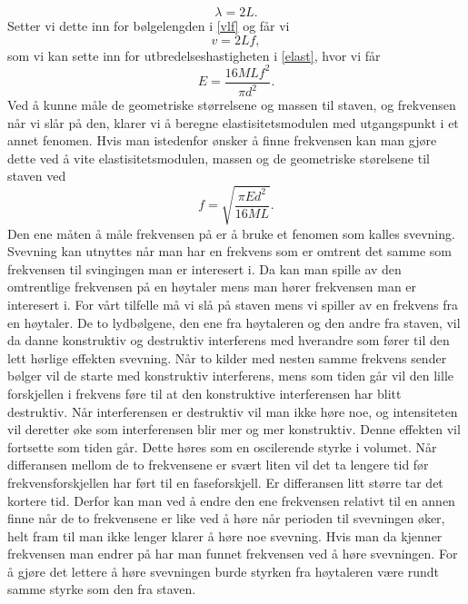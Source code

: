 \documentclass[%
 reprint,
 amsmath,amssymb,
 aps,
 norsk,
 booktabs
]{revtex4-1}
\begin{document}
\begin{equation}
  \lambda = 2L.
\end{equation}
Setter vi dette inn for bølgelengden i \eqref{vlf} og får vi
\begin{equation*}
  v = 2Lf,
\end{equation*}
som vi kan sette inn for utbredelseshastigheten i \eqref{elast}, hvor vi får
\begin{equation}
  E = \frac{16MLf^2}{\pi d^2}. \label{young5}
\end{equation}
Ved å kunne måle de geometriske størrelsene og massen til staven, og frekvensen når vi slår på den, klarer vi å beregne elastisitetsmodulen med utgangspunkt i et annet fenomen. Hvis man istedenfor ønsker å finne frekvensen kan man gjøre dette ved å vite elastisitetsmodulen, massen og de geometriske størelsene til staven ved
\begin{equation}
  f = \sqrt{\frac{\pi E d^2}{16ML}}. \label{young6}
\end{equation}
Den ene måten å måle frekvensen på er å bruke et fenomen som kalles svevning. Svevning kan utnyttes når man har en frekvens som er omtrent det samme som frekvensen til svingingen man er interesert i. Da kan man spille av den omtrentlige frekvensen på en høytaler mens man hører frekvensen man er interesert i. For vårt tilfelle må vi slå på staven mens vi spiller av en frekvens fra en høytaler. De to lydbølgene, den ene fra høytaleren og den andre fra staven, vil da danne konstruktiv og destruktiv interferens med hverandre som fører til den lett hørlige effekten svevning. Når to kilder med nesten samme frekvens sender bølger vil de starte med konstruktiv interferens, mens som tiden går vil den lille forskjellen i frekvens føre til at den konstruktive interferensen har blitt destruktiv. Når interferensen er destruktiv vil man ikke høre noe, og intensiteten vil deretter øke som interferensen blir mer og mer konstruktiv. Denne effekten vil fortsette som tiden går. Dette høres som en oscilerende styrke i volumet. Når differansen mellom de to frekvensene er svært liten vil det ta lengere tid før frekvensforskjellen har ført til en faseforskjell. Er differansen litt større tar det kortere tid. Derfor kan man ved å endre den ene frekvensen relativt til en annen finne når de to frekvensene er like ved å høre når perioden til svevningen øker, helt fram til man ikke lenger klarer å høre noe svevning. Hvis man da kjenner frekvensen man endrer på har man funnet frekvensen ved å høre svevningen. For å gjøre det lettere å høre svevningen burde styrken fra høytaleren være rundt samme styrke som den fra staven.
\end{document}
